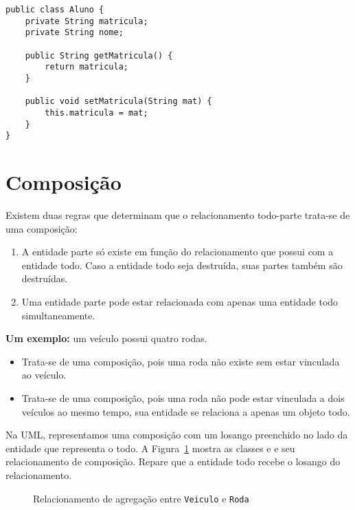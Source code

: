 \begin{verbatim}
public class Aluno {
	private String matricula;
	private String nome;
	
	public String getMatricula() {
		return matricula;
	}

	public void setMatricula(String mat) {
		this.matricula = mat;
	}
}
\end{verbatim}
 
\section{Composição}
Existem duas regras que determinam que o relacionamento todo-parte trata-se de uma composição:

\begin{enumerate}
	\item A entidade parte só existe em função do relacionamento que possui com a entidade todo. Caso a entidade todo seja destruída, suas partes também são destruídas.
	\item Uma entidade parte pode estar relacionada com apenas uma entidade todo simultaneamente.
\end{enumerate}

\textbf{Um exemplo:} um veículo possui quatro rodas.
\begin{itemize}
	\item Trata-se de uma composição, pois uma roda não existe sem estar vinculada ao veículo.
	\item Trata-se de uma composição, pois uma roda não pode estar vinculada a dois veículos ao mesmo tempo, sua entidade se relaciona a apenas um objeto todo.
\end{itemize}

Na UML, representamos uma composição com um losango preenchido no lado da entidade que representa o todo. A Figura~\ref{fig:composicao-veiculo-roda} mostra as classes  e  e seu relacionamento de composição. Repare que a entidade todo recebe o losango do relacionamento.

\begin{figure}[h]
	\centering
	
	
	\caption{Relacionamento de agregação entre \texttt{Veiculo} e \texttt{Roda}}
	\label{fig:composicao-veiculo-roda}
\end{figure}
 

